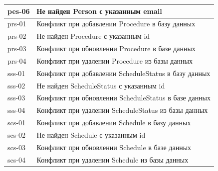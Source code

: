 \documentclass[a4paper,article]{article}
\begin{document}
\begin{sloppypar}
\begin{appendices}
\begin{xltabular}{\textwidth} { |
                >{\hsize} X |
                >{\hsize} X | }
            \hline
            pes-06
            & Не найден Person с указанным email \\
            
            \hline
            prs-01
            & Конфликт при добавлении Procedure в базу данных \\
            
            \hline
            prs-02
            & Не найден Procedure с указанным id \\
            
            \hline
            prs-03
            & Конфликт при обновлении Procedure в базе данных \\
            
            \hline
            prs-04
            & Конфликт при удалении Procedure из базы данных \\
            
            \hline
            sss-01
            & Конфликт при добавлении ScheduleStatus в базу данных \\
            
            \hline
            sss-02
            & Не найден ScheduleStatus с указанным id \\
            
            \hline
            sss-03
            & Конфликт при обновлении ScheduleStatus в базе данных \\
            
            \hline
            sss-04
            & Конфликт при удалении ScheduleStatus из базы данных \\
            
            \hline
            scs-01
            & Конфликт при добавлении Schedule в базу данных \\
            
            \hline
            scs-02
            & Не найден Schedule с указанным id \\
            
            \hline
            scs-03
            & Конфликт при обновлении Schedule в базе данных \\
            
            \hline
            scs-04
            & Конфликт при удалении Schedule из базы данных \\
            
            \hline
        \end{xltabular}
        

\end{appendices}
\end{sloppypar}
\end{document}
